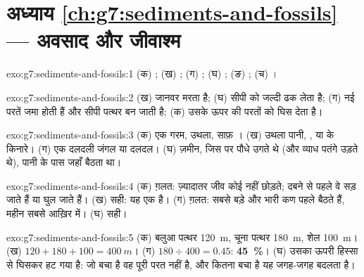 \section*{अध्याय \ref{ch:g7:sediments-and-fossils} --- अवसाद और जीवाश्म}

\begin{solution}{exo:g7:sediments-and-fossils:1}
(क) ; (ख) ; (ग) ; (घ) ; (ङ) ; (च)
।
\end{solution}

\begin{solution}{exo:g7:sediments-and-fossils:2}
(ख) जानवर मरता है; (घ)  सीपी को जल्दी ढक लेता है; (ग) नई परतें जमा होती हैं
और सीपी पत्थर बन जाती है; (क)  उसके ऊपर की परतों को घिस
देता है।
\end{solution}

\begin{solution}{exo:g7:sediments-and-fossils:3}
(क) एक गरम, उथला, साफ़ । (ख) उथला पानी, ,  या  के किनारे।
(ग) एक दलदली जंगल या दलदल। (घ) ज़मीन, जिस पर पौधे उगते थे (और व्याध पतंगे उड़ते
थे), पानी के पास जहाँ 
बैठता था।
\end{solution}

\begin{solution}{exo:g7:sediments-and-fossils:4}
(क) ग़लत: ज़्यादातर जीव कोई  नहीं छोड़ते; दबने से पहले वे सड़ जाते हैं या
घुल जाते हैं। (ख) सही: यह एक  है। (ग) ग़लत: सबसे बड़े और भारी कण
पहले बैठते हैं, महीन  सबसे आख़िर में। (घ) सही।
\end{solution}

\begin{solution}{exo:g7:sediments-and-fossils:5}
(क) बलुआ पत्थर \qty{120}{m}, चूना पत्थर \qty{180}{m}, शेल \qty{100}{m}।
(ख) $120 + 180 + 100 = \qty{400}{m}$। (ग) $180 \div 400 = 0.45$:
\textbf{45~\%}। (घ) उसका ऊपरी हिस्सा  से घिसकर हट गया है: जो बचा है वह पूरी
परत नहीं है, और कितना बचा है यह जगह-जगह बदलता है।
\end{solution}


